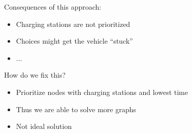 \begin{frame}
  Consequences of this approach:
  \begin{itemize}
    \item Charging stations are not prioritized
    \item Choices might get the vehicle ``stuck''
    \item ...
  \end{itemize}
\end{frame}
\begin{frame}
  How do we fix this?
  \begin{itemize}
    \item Prioritize nodes with charging stations and lowest time
    \item Thus we are able to solve more graphs
    \item Not ideal solution
  \end{itemize}

\end{frame}

